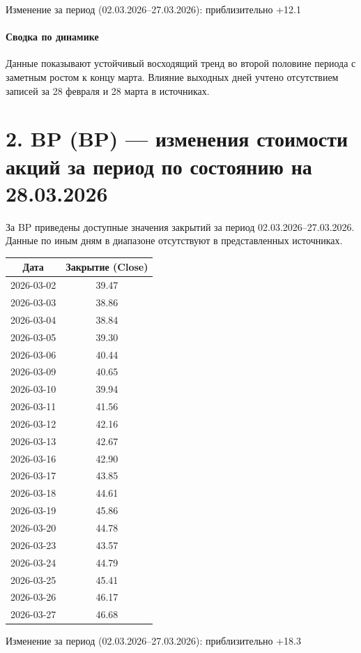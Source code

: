\documentclass[12pt]{article}
\begin{document}
Изменение за период (02.03.2026–27.03.2026): приблизительно +12.1%

\paragraph*{Сводка по динамике}
Данные показывают устойчивый восходящий тренд во второй половине периода с заметным ростом к концу марта. Влияние выходных дней учтено отсутствием записей за 28 февраля и 28 марта в источниках.

\section*{2. BP (BP) — изменения стоимости акций за период по состоянию на 28.03.2026}
За BP приведены доступные значения закрытий за период 02.03.2026–27.03.2026. Данные по иным дням в диапазоне отсутствуют в представленных источниках.

\begin{center}
\begin{tabular}{|c|c|}
\hline
Дата & Закрытие (Close) \\
\hline
2026-03-02 & 39.47 \\
2026-03-03 & 38.86 \\
2026-03-04 & 38.84 \\
2026-03-05 & 39.30 \\
2026-03-06 & 40.44 \\
2026-03-09 & 40.65 \\
2026-03-10 & 39.94 \\
2026-03-11 & 41.56 \\
2026-03-12 & 42.16 \\
2026-03-13 & 42.67 \\
2026-03-16 & 42.90 \\
2026-03-17 & 43.85 \\
2026-03-18 & 44.61 \\
2026-03-19 & 45.86 \\
2026-03-20 & 44.78 \\
2026-03-23 & 43.57 \\
2026-03-24 & 44.79 \\
2026-03-25 & 45.41 \\
2026-03-26 & 46.17 \\
2026-03-27 & 46.68 \\
\hline
\end{tabular}
\end{center}

Изменение за период (02.03.2026–27.03.2026): приблизительно +18.3%
\end{document}
